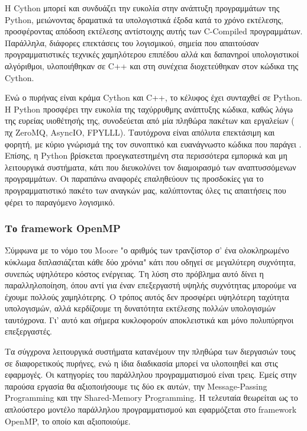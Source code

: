 Η Cython \cite{cython}\cite{bCython} μπορεί και συνδυάζει την ευκολία στην ανάπτυξη προγραμμάτων της Python, μειώνοντας δραματικά τα υπολογιστικά έξοδα κατά το χρόνο εκτέλεσης, προσφέροντας απόδοση εκτέλεσης αντίστοιχης αυτής των C-Compiled προγραμμάτων. Παράλληλα, διάφορες επεκτάσεις του λογισμικού, σημεία που απαιτούσαν προγραμματιστικές τεχνικές χαμηλότερου επιπέδου αλλά και δαπανηροί υπολογιστικοί αλγόριθμοι, υλοποιήθηκαν σε C++  και στη συνέχεια διοχετεύθηκαν στον κώδικα της Cython.  

Ενώ ο πυρήνας είναι κράμα Cython και C++, το κέλυφος έχει συνταχθεί σε Python. H Python προσφέρει την ευκολία της ταχύρρυθμης ανάπτυξης κώδικα, καθώς λόγω της ευρείας υιοθέτησής της, συνοδεύεται από μία πληθώρα  πακέτων και εργαλείων ( πχ ZeroMQ, AsyncIO, FPYLLL). Ταυτόχρονα είναι απόλυτα επεκτάσιμη και φορητή, με κύριο γνώρισμά της τον συνοπτικό και ευανάγνωστο κώδικα που παράγει . Επίσης, η Python βρίσκεται προεγκατεστημένη στα περισσότερα εμπορικά και μη λειτουργικά συστήματα, κάτι που διευκολύνει τον διαμοιρασμό των αναπτυσσόμενων προγραμμάτων. Οι παραπάνω αναφορές επαληθεύουν τις προσδοκίες για το προγραμματιστικό πακέτο των αναγκών μας, καλύπτοντας όλες τις απαιτήσεις που φέρει το παραγόμενο λογισμικό. 


\subsubsection{Το \lt framework OpenMP}

Σύμφωνα με το νόμο του Moore "ο αριθμός των τρανζίστορ σ' ένα ολοκληρωμένο κύκλωμα διπλασιάζεται κάθε δύο χρόνια" κάτι που οδηγεί σε μεγαλύτερη συχνότητα, συνεπώς υψηλότερο κόστος ενέργειας. Τη λύση στο πρόβλημα αυτό δίνει η παραλληλοποίηση, όπου αντί για έναν επεξεργαστή υψηλής συχνότητας μπορούμε να έχουμε πολλούς χαμηλότερης. Ο τρόπος αυτός δεν προσφέρει υψηλότερη ταχύτητα υπολογισμών, αλλά κερδίζουμε τη δυνατότητα εκτέλεσης πολλών υπολογισμών ταυτόχρονα. Γι' αυτό και σήμερα κυκλοφορούν αποκλειστικά και μόνο πολυπύρηνοι επεξεργαστές.  

Τα σύγχρονα λειτουργικά συστήματα κατανέμουν την πληθώρα των διεργασιών τους σε διαφορετικούς πυρήνες, ενώ η ίδια διαδικασία μπορεί να υλοποιηθεί και στις εφαρμογές. Οι κατηγορίες  του παράλληλου προγραμματισμού είναι τρεις. Εμείς στην παρούσα εργασία θα αξιοποιήσουμε τις δύο εκ αυτών, την Message-Passing Programming  και την Shared-Memory Programming. Η τελευταία θεωρείται ως το απλούστερο μοντέλο παράλληλου προγραμματισμού και εφαρμόζεται στο framework OpenMP, το οποίο και αξιοποιούμε. 

